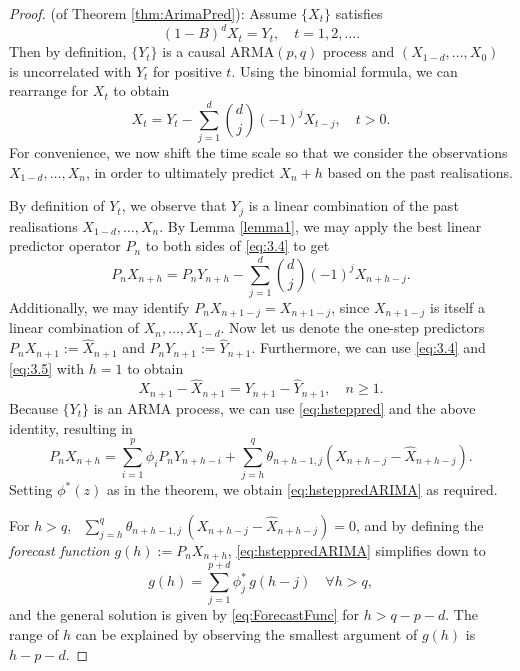 \documentclass[a4paper, oneside]{discothesis}
\begin{document}
\begin{proof}
    (of Theorem \ref{thm:ArimaPred}): Assume $\{X_t\}$ satisfies
    \begin{equation*}
        (1-B)^d X_t = Y_t, \quad t = 1, 2, \dots.
    \end{equation*}
    Then by definition, $\{Y_t\}$ is a causal $\mathrm{ARMA}(p,q)$ process and $(X_{1-d}, \dots, X_0)$ is uncorrelated with $Y_t$ for positive $t$. Using the binomial formula, we can rearrange for $X_t$ to obtain
    \begin{equation}\label{eq:3.4}
        X_t = Y_t - \sum_{j=1}^d \binom{d}{j} (-1)^j X_{t-j}, \quad t > 0.
    \end{equation}
    For convenience, we now shift the time scale so that we consider the observations $X_{1-d}, \dots, X_n$, in order to ultimately predict $X_n+h$ based on the past realisations.
    
    By definition of $Y_t$, we observe that $Y_j$ is a linear combination of the past realisations $X_{1-d}, \dots, X_n$. By Lemma \ref{lemma1}, we may apply the best linear predictor operator $P_n$ to both sides of \eqref{eq:3.4} to get
    \begin{equation}\label{eq:3.5}
        P_n X_{n+h} = P_n Y_{n+h} - \sum_{j=1}^d \binom{d}{j} (-1)^j X_{n+h-j}.
    \end{equation}
    Additionally, we may identify $P_n X_{n+1-j} = X_{n+1-j}$, since $X_{n+1-j}$ is itself a linear combination of $X_n, \dots, X_{1-d}$.
    Now let us denote the one-step predictors $P_n X_{n+1} := \hat{X}_{n+1}$ and $P_n Y_{n+1} := \hat{Y}_{n+1}$. Furthermore, we can use \eqref{eq:3.4} and \eqref{eq:3.5} with $h=1$ to obtain 
    \begin{equation*}
        X_{n+1} - \hat{X}_{n+1} = Y_{n+1} - \hat{Y}_{n+1}, \quad n \geq 1.
    \end{equation*}
    Because $\{Y_t\}$ is an ARMA process, we can use \eqref{eq:hsteppred} and the above identity, resulting in
    \begin{equation*}
         P_n X_{n+h} = \sum_{i=1}^p \phi_i P_n Y_{n+h-i} + \sum_{j=h}^q \theta_{n+h-1,j}(X_{n+h-j} - \hat{X}_{n+h-j}).
    \end{equation*}
    Setting $\phi^*(z)$ as in the theorem, we obtain \eqref{eq:hsteppredARIMA} as required.
    
    For $h > q$, \, $\sum_{j=h}^q \theta_{n+h-1,j}\,(X_{n+h-j} - \hat{X}_{n+h-j}) = 0$, and by defining the \textit{forecast function} $g(h) := P_n X_{n+h}$, \eqref{eq:hsteppredARIMA} simplifies down to
    \begin{equation*}
        g(h) = \sum_{j=1}^{p+d} \phi^*_j \, g(h-j) \quad \forall h > q,
    \end{equation*}
    \enlargethispage{\baselineskip}
    and the general solution is given by  \eqref{eq:ForecastFunc} for $h > q - p - d$. The range of $h$ can be explained by observing the smallest argument of $g(h)$ is $h-p-d$.
\end{proof}
\end{document}
